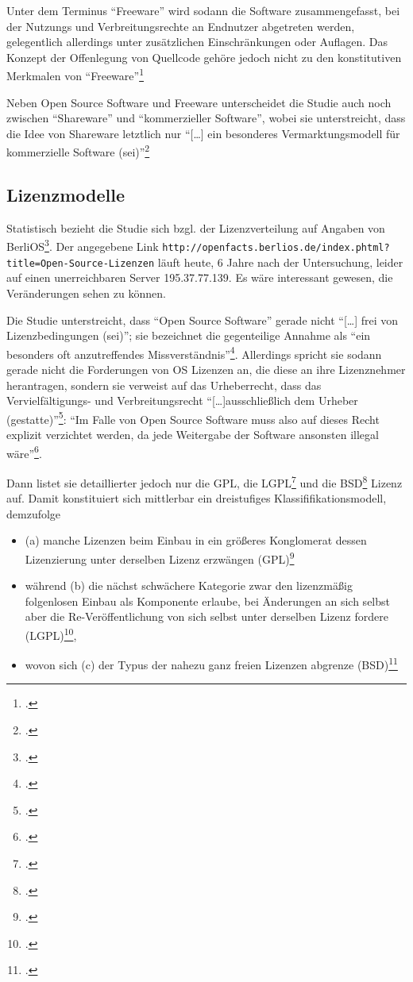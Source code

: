 \documentclass[DIV=calc,BCOR=5mm,11pt,headings=small,oneside,abstract=true, toc=bib]{scrartcl}
\begin{document}
Unter dem Terminus \enquote{Freeware} wird sodann die Software
zusammengefasst, bei der Nutzungs und Verbreitungsrechte an Endnutzer abgetreten
werden, gelegentlich allerdings unter zusätzlichen Einschränkungen oder
Auflagen. Das Konzept der Offenlegung von Quellcode gehöre jedoch nicht zu den
konstitutiven Merkmalen von
\enquote{Freeware}\footcite[vgl.][14]{RenVetRexKet2005a}

Neben Open Source Software und Freeware unterscheidet die Studie auch noch
zwischen \enquote{Shareware} und \enquote{kommerzieller Software}, wobei
sie unterstreicht, dass die Idee von Shareware letztlich nur \enquote{[\ldots] ein
besonderes Vermarktungsmodell für kommerzielle Software
(sei)}\footcite[vgl.][14f]{RenVetRexKet2005a}

\subsection{Lizenzmodelle}

Statistisch bezieht die Studie sich bzgl. der Lizenzverteilung auf Angaben von
BerliOS\footcite[vgl.][22]{RenVetRexKet2005a}. Der angegebene Link 
\texttt{http://openfacts.berlios.de/index.phtml?title=Open-Source-Lizenzen}
läuft heute, 6 Jahre nach der Untersuchung, leider auf einen unerreichbaren
Server 195.37.77.139. Es wäre interessant gewesen, die Veränderungen sehen zu
können.

Die Studie unterstreicht, dass \enquote{Open Source Software} gerade nicht
\enquote{[\ldots] frei von Lizenzbedingungen (sei)}; sie bezeichnet die
gegenteilige Annahme als \enquote{ein besonders oft anzutreffendes
Missverständnis}\footcite[vgl.][19]{RenVetRexKet2005a}. Allerdings spricht
sie sodann gerade nicht die Forderungen von OS Lizenzen an, die diese an ihre
Lizenznehmer herantragen, sondern sie verweist auf das Urheberrecht, dass
das Vervielfältigungs- und Verbreitungsrecht \enquote{[\ldots]ausschließlich dem
Urheber (gestatte)}\footcite[vgl.][19]{RenVetRexKet2005a}:
\enquote{Im Falle von Open Source Software muss also auf dieses Recht
explizit verzichtet werden, da jede Weitergabe der Software ansonsten
illegal wäre}\footcite[][19f]{RenVetRexKet2005a}.

Dann listet sie detaillierter jedoch nur die
GPL, die
LGPL\footcite[vgl.][21]{RenVetRexKet2005a} und die
BSD\footcite[vgl.][21]{RenVetRexKet2005a} Lizenz auf. Damit konstituiert sich
mittlerbar ein dreistufiges Klassififikationsmodell, demzufolge 
\begin{itemize}
  \item (a) manche Lizenzen beim Einbau in ein größeres Konglomerat dessen
  Lizenzierung unter derselben Lizenz erzwängen
  (GPL)\footcite[vgl.][20]{RenVetRexKet2005a}
  \item während (b) die nächst schwächere Kategorie zwar den lizenzmäßig
  folgenlosen Einbau als Komponente erlaube, bei Änderungen an sich selbst aber
  die Re-Veröffentlichung von sich selbst unter derselben Lizenz fordere
  (LGPL)\footcite[vgl.][21]{RenVetRexKet2005a},
  \item wovon sich (c) der Typus der nahezu ganz freien Lizenzen abgrenze
  (BSD)\footcite[vgl.][21]{RenVetRexKet2005a}
\end{itemize}
\end{document}
